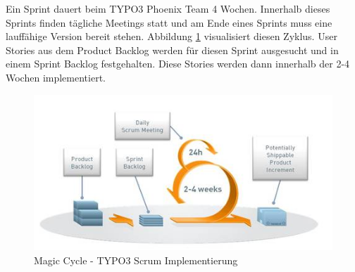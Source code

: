 Ein Sprint dauert beim TYPO3 Phoenix Team 4 Wochen. Innerhalb dieses Sprints finden tägliche
Meetings statt und am Ende eines Sprints muss eine lauffähige Version bereit stehen. Abbildung 
\ref{magic-cycle} visualisiert diesen Zyklus. User Stories aus dem Product Backlog werden für
diesen Sprint ausgesucht und in einem Sprint Backlog festgehalten. Diese Stories werden dann
innerhalb der 2-4 Wochen implementiert.
\begin{figure}[h]
	\centering
	\includegraphics[width=1\textwidth]{images/typo3-magic-cycle.jpg}
	\caption{Magic Cycle - TYPO3 Scrum Implementierung}
	\label{magic-cycle}
\end{figure}


